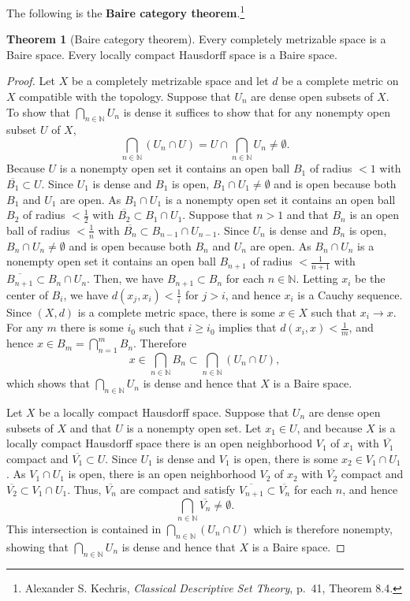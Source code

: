 \documentclass{article}
\theoremstyle{definition}
\newtheorem{theorem}{Theorem}
\theoremstyle{definition}
\begin{document}
The following is the \textbf{Baire category theorem}.\footnote{Alexander S. Kechris, {\em Classical Descriptive Set Theory}, p.~41, Theorem
8.4.}

\begin{theorem}[Baire category theorem]
Every completely metrizable space is a Baire space. Every locally compact Hausdorff space is a Baire space.
\end{theorem}
\begin{proof}
Let  $X$ be a completely metrizable space and let $d$ be a complete metric on $X$ compatible with the topology. 
Suppose that $U_n$ are dense open subsets of $X$. To show that $\bigcap_{n \in \mathbb{N}} U_n$ is dense it suffices
to show that for any nonempty open subset $U$ of $X$,
\[
\bigcap_{n \in \mathbb{N}} (U_n \cap U) = U \cap \bigcap_{n \in \mathbb{N}} U_n \neq \emptyset. 
\]
Because $U$ is a nonempty open set it contains an open ball $B_1$ of radius $<1$ with $\overline{B_1} \subset U$. 
Since $U_1$ is dense and $B_1$ is open, $B_1 \cap U_1 \neq \emptyset$ and is open because both $B_1$ and $U_1$ are open.
As $B_1 \cap U_1$ is a nonempty open set it contains an open ball $B_2$ of radius $<\frac{1}{2}$ with
$\overline{B_2} \subset B_1 \cap U_1$. Suppose that $n>1$ and that $B_n$ is an open ball of radius $<\frac{1}{n}$ with
$\overline{B_n} \subset B_{n-1} \cap U_{n-1}$. Since $U_n$ is dense and $B_n$ is open,
$B_n \cap U_n \neq \emptyset$ and is open because both $B_n$ and $U_n$ are open.
As $B_n \cap U_n$ is a nonempty open set it contains an open ball $B_{n+1}$ of radius $<\frac{1}{n+1}$ with
$\overline{B_{n+1}} \subset B_n \cap U_n$. Then, we have $B_{n+1} \subset B_n$ for each $n \in \mathbb{N}$. 
Letting $x_i$ be the center of $B_i$, we have $d(x_j,x_i)<\frac{1}{i}$ for $j >i$, and hence $x_i$ is a Cauchy sequence.
Since $(X,d)$ is a complete metric space, there is some $x \in X$ such that $x_i \to x$. For
any $m$ there is some $i_0$ such that $i \geq i_0$ implies that
$d(x_i,x)<\frac{1}{m}$, and hence 
$x \in B_m = \bigcap_{n=1}^m B_n$. Therefore
\[
x \in \bigcap_{n \in \mathbb{N}} B_n \subset \bigcap_{n \in \mathbb{N}} (U_n \cap U),
\]
which shows that $\bigcap_{n \in \mathbb{N}} U_n$ is dense and hence that $X$ is a Baire space.


Let  $X$ be a locally compact Hausdorff space.  Suppose that $U_n$ are dense
open subsets of $X$ and that $U$ is a nonempty open set.  
Let $x_1 \in U$, and because $X$ is a locally compact Hausdorff space there is an open neighborhood
$V_1$ of $x_1$ with $\overline{V_1}$ compact and $\overline{V_1} \subset U$. 
Since $U_1$ is dense and $V_1$ is open, there is some $x_2 \in V_1 \cap U_1$.
As $V_1 \cap U_1$ is open, there is an open neighborhood $V_2$ of $x_2$ with $\overline{V_2}$ compact and 
$\overline{V_2} \subset V_1 \cap U_1$. Thus, $\overline{V_n}$ are compact and satisfy 
$\overline{V_{n+1}} \subset \overline{V_n}$ for each $n$, and
hence
\[
\bigcap_{n \in \mathbb{N}} \overline{V_n} \neq \emptyset. 
\]
This intersection is contained in $\bigcap_{n \in \mathbb{N}} (U_n \cap U)$ which is therefore nonempty,
showing that $\bigcap_{n \in \mathbb{N}} U_n$
is dense and hence that $X$ is a Baire space.
\end{proof} 
\end{document}
